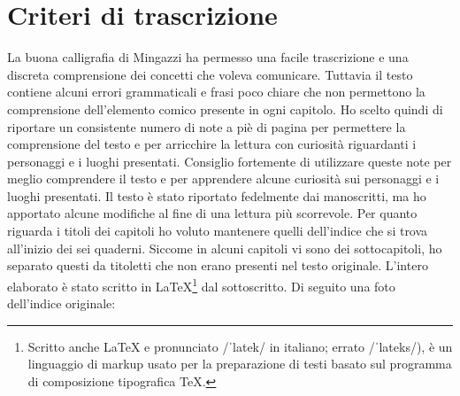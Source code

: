 \thispagestyle{empty}
\chapter*{Criteri di trascrizione}
La buona calligrafia di Mingazzi ha permesso una facile trascrizione e una discreta comprensione dei concetti che voleva comunicare. Tuttavia il testo contiene alcuni errori grammaticali e frasi poco chiare che non permettono la comprensione dell'elemento comico presente in ogni capitolo. Ho scelto quindi di riportare un consistente numero di note a piè di pagina per permettere la comprensione del testo e per arricchire la lettura con curiosità riguardanti i personaggi e i luoghi presentati. Consiglio fortemente di utilizzare queste note per meglio comprendere il testo e per apprendere alcune curiosità sui personaggi e i luoghi presentati. Il testo è stato riportato fedelmente dai manoscritti, ma ho apportato alcune modifiche al fine di una lettura più scorrevole. Per quanto riguarda i titoli dei capitoli ho voluto mantenere quelli dell'indice che si trova all'inizio dei sei quaderni. Siccome in alcuni capitoli vi sono dei sottocapitoli, ho separato questi da titoletti che non erano presenti nel testo originale. L'intero elaborato è stato scritto in \LaTeX\footnote{Scritto anche \LaTeX \: e pronunciato /ˈlatek/ in italiano; errato /ˈlateks/), è un linguaggio di markup usato per la preparazione di testi basato sul programma di composizione tipografica \TeX.} \:dal sottoscritto.\newpage
\noindent Di seguito una foto dell'indice originale:\\
